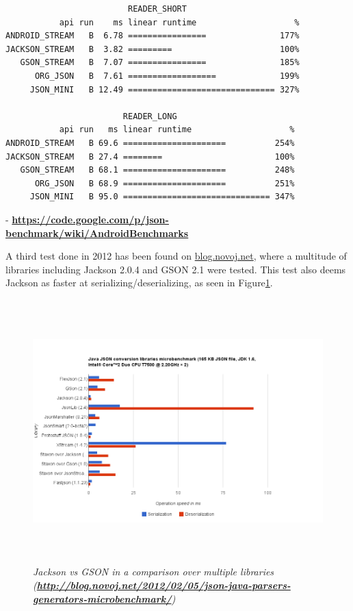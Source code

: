 \begin{enumerate}
\begin{verbatim}
                         READER_SHORT                        
           api run    ms linear runtime                    % 
ANDROID_STREAM   B  6.78 ================               177% 
JACKSON_STREAM   B  3.82 =========                      100% 
   GSON_STREAM   B  7.07 ================               185% 
      ORG_JSON   B  7.61 ==================             199% 
     JSON_MINI   B 12.49 ============================== 327% 

                        READER_LONG                         
           api run   ms linear runtime                    % 
ANDROID_STREAM   B 69.6 =====================          254% 
JACKSON_STREAM   B 27.4 ========                       100% 
   GSON_STREAM   B 68.1 =====================          248% 
      ORG_JSON   B 68.9 =====================          251% 
     JSON_MINI   B 95.0 ============================== 347% 
  \end{verbatim}  -
  \textbf{\url{https://code.google.com/p/json-benchmark/wiki/AndroidBenchmarks}}\newline
   
  A third test done in 2012 has been found on \url{blog.novoj.net}, where a
  multitude of libraries including Jackson 2.0.4 and GSON 2.1 were tested. This
  test also deems Jackson as faster at serializing/deserializing, as seen in
  Figure\ref{fig:jacksonvsgson2}.\newline
  
  \begin{figure}
  \includegraphics[height=4in,width=6.23in]{./images/benchmarks/oimg.png}
  \caption{\small \sl Jackson vs GSON in a comparison over multiple libraries
  (\textbf{\url{http://blog.novoj.net/2012/02/05/json-java-parsers-generators-microbenchmark/}})}
  \label{fig:jacksonvsgson2}
  \end{figure}
  

\end{enumerate}

